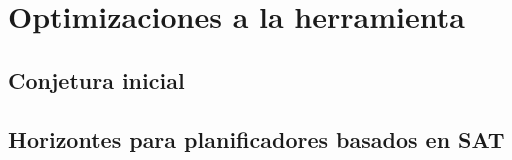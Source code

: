 
\chapter{Optimizaciones a la herramienta}
\label{Chapter3}

\section{Conjetura inicial}
\section{Horizontes para planificadores basados en SAT}
